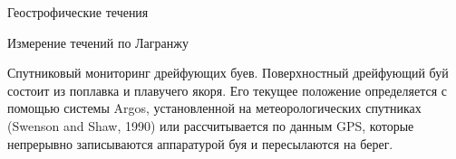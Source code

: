 \begin{chapter}{Геострофические течения}
\begin{section}{Измерение течений по Лагранжу}
\begin{paragraph}{Спутниковый мониторинг дрейфующих буев.}
%
%
%
Поверхностный дрейфующий буй состоит из поплавка и плавучего якоря. 
Его текущее положение определяется с помощью системы Argos, 
установленной на метеорологических спутниках (Swenson and Shaw, 1990) 
или рассчитывается по данным GPS, которые непрерывно записываются аппаратурой
буя и пересылаются на берег.
%


\end{paragraph}
\end{section}
\end{chapter}
